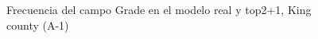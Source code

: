 \begin{figure}[H]
    \centering
    
    \caption{Frecuencia del campo Grade en el modelo real y top2+1, King county (A-1)}
    \label{frecuency-top2+1-grade}
\end{figure}